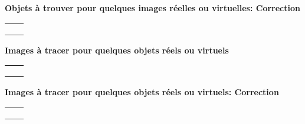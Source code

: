 \documentclass{article}
\newcommand{\titre}[1]{
\begin{center}
  {\Large\textbf{#1}}
\end{center}

}
\begin{document}
\titre{Objets \`a trouver pour quelques images r\'eelles ou virtuelles: Correction}
\begin{tabular}{|c|c|}
\hline
&\\ \hline
&\\ \hline
&\\ \hline
&\\ \hline
\end{tabular}


\newpage
\setcounter{page}{1}
\titre{Images \`a tracer pour quelques objets r\'eels ou virtuels}
\begin{tabular}{|c|c|}
\hline
&\\ \hline
&\\ \hline
&\\ \hline
&\\ \hline
\end{tabular}


\newpage


\titre{Images \`a tracer pour quelques objets r\'eels ou virtuels: Correction}
\begin{tabular}{|c|c|}
\hline
&\\ \hline
&\\ \hline
&\\ \hline
&\\ \hline
\end{tabular}


\newpage
\end{document}
